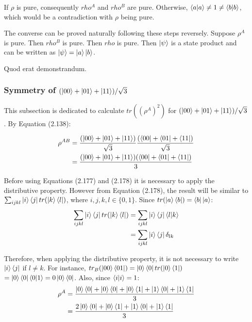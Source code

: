 If $\rho$ is pure, consequently $rho^A$ and $rho^B$ are pure.
Otherwise, $\mathop{\mathinner{ \langle{a}|{a}\rangle}} \neq 1 \neq \mathop{\mathinner{ \langle{b}|{b}\rangle}}$,
which would be a contradiction with $\rho$ being pure.

The converse can be proved naturally following these steps reversely.
Suppose $\rho^A$ is pure. Then $rho^B$ is pure. Then $rho$ is pure.
Then $\ket{\psi}$ is a state product and can be written as
$\ket{\psi} = \ket{a} \ket{b}$.

Quod erat demonstrandum.

\subsubsection[Symmetry of Triple State Entanglement]
{Symmetry of $(\ket{00} + \ket{01} + \ket{11})/\sqrt{3}$}

This subsection is dedicated to calculate $tr((\rho^A)^2)$
for $(\ket{00} + \ket{01} + \ket{11})/\sqrt{3}$. By Equation (2.138):

\begin{align}
    \rho^{AB} &= \frac{(\ket{00} + \ket{01} + \ket{11})}{\sqrt{3}}
        \frac{(\bra{00} + \bra{01} + \bra{11})}{\sqrt{3}} \\
        &= \frac{(\ket{00} + \ket{01} + \ket{11})(\bra{00} + \bra{01} + \bra{11})}{3}
\end{align}

Before using Equations (2.177) and (2.178) it is necessary to apply the distributive property.
However from Equation (2.178), the result will be similar to
$\sum_{ijkl} \ket{i}\bra{j} tr(\ket{k}\bra{l})$, where $i, j, k, l \in \{0, 1\}$.
Since $tr(\ket{a}\bra{b}) = \bra{b}\ket{a}$:
\begin{align}
    \sum_{ijkl} \ket{i}\bra{j} tr(\ket{k}\bra{l}) &=
        \sum_{ijkl} \ket{i}\bra{j}\mathop{\mathinner{ \langle{l}|{k}\rangle}} \\
        &= \sum_{ijkl} \ket{i}\bra{j}\delta_{lk}
\end{align}

Therefore, when applying the distributive property,
it is not necessary to write $\ket{i}\bra{j}$ if $l \neq k$.
For instance,
$tr_B(\ket{00}\bra{01}) = \ket{0}\bra{0}tr(\ket{0}\bra{1})$
$= \ket{0}\bra{0}\mathop{\mathinner{ \langle{0}|{1}\rangle}} = 0 \ket{0}\bra{0}$.
Also, since $\mathop{\mathinner{ \langle{i}|{i}\rangle}} = 1$:
\begin{align}
    \rho^A &= \frac{\ket{0}\bra{0} + \ket{0}\bra{0} + \ket{0}\bra{1} +
        \ket{1}\bra{0} + \ket{1}\bra{1}}{3} \\
    &= \frac{2\ket{0}\bra{0} + \ket{0}\bra{1} +
        \ket{1}\bra{0} + \ket{1}\bra{1}}{3}
\end{align}

